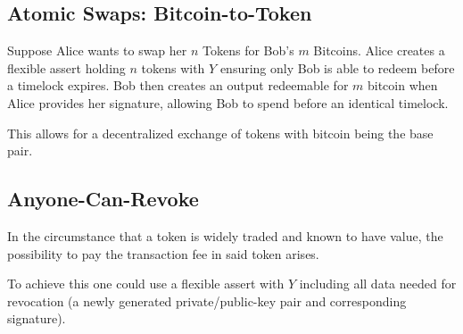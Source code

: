 \documentclass[9pt,oneside]{amsart}
\begin{document}
\begin{multicols}{2}
\subsection{Atomic Swaps: Bitcoin-to-Token}
Suppose Alice wants to swap her $n$ Tokens for Bob's $m$ Bitcoins. Alice creates a flexible assert holding $n$ tokens with $Y$ ensuring only Bob is able to redeem before a timelock expires. Bob then creates an output redeemable for $m$ bitcoin when Alice provides her signature, allowing Bob to spend before an identical timelock.

This allows for a decentralized exchange of tokens with bitcoin being the base pair.

\subsection{Anyone-Can-Revoke}
In the circumstance that a token is widely traded and known to have value, the possibility to pay the transaction fee in said token arises.

To achieve this one could use a flexible assert with $Y$ including all data needed for revocation (a newly generated private/public-key pair and corresponding signature).

\end{multicols}
\end{document}
